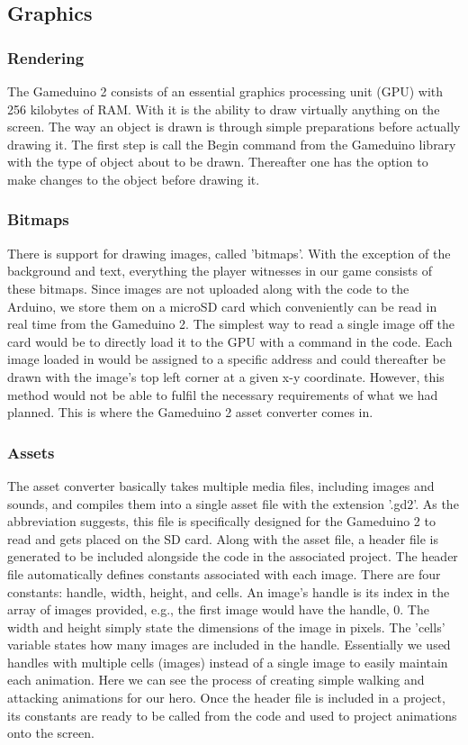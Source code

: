 \subsection*{Graphics}
\subsubsection*{Rendering}
The Gameduino 2 consists of an essential graphics processing unit (GPU) with 256 kilobytes of RAM. With it is the ability to draw virtually anything on the screen. The way an object is drawn is through simple preparations before actually drawing it. The first step is call the Begin command from the Gameduino library with the type of object about to be drawn. Thereafter one has the option to make changes to the object before drawing it. 

\subsubsection*{Bitmaps}
 There is support for drawing images, called 'bitmaps'. With the exception of the background and text, everything the player witnesses in our game consists of these bitmaps. Since images are not uploaded along with the code to the Arduino, we store them on a microSD card which conveniently can be read in real time from the Gameduino 2. The simplest way to read a single image off the card would be to directly load it to the GPU with a command in the code. Each image loaded in would be assigned to a specific address and could thereafter be drawn with the image's top left corner at a given x-y coordinate. However, this method would not be able to fulfil the necessary requirements of what we had planned. This is where the Gameduino 2 asset converter comes in.

\subsubsection*{Assets}
The asset converter basically takes multiple media files, including images and sounds, and compiles them into a single asset file with the extension '.gd2'. As the abbreviation suggests, this file is specifically designed for the Gameduino 2 to read and gets placed on the SD card. Along with the asset file, a header file is generated to be included alongside the code in the associated project. The header file automatically defines constants associated with each image. There are four constants: handle, width, height, and cells. An image's handle is its index in the array of images provided, e.g., the first image would have the handle, 0. The width and height simply state the dimensions of the image in pixels. The 'cells' variable states how many images are included in the handle. Essentially we used handles with multiple cells (images) instead of a single image to easily maintain each animation. Here we can see the process of creating simple walking and attacking animations for our hero. Once the header file is included in a project, its constants are ready to be called from the code and used to project animations onto the screen.


